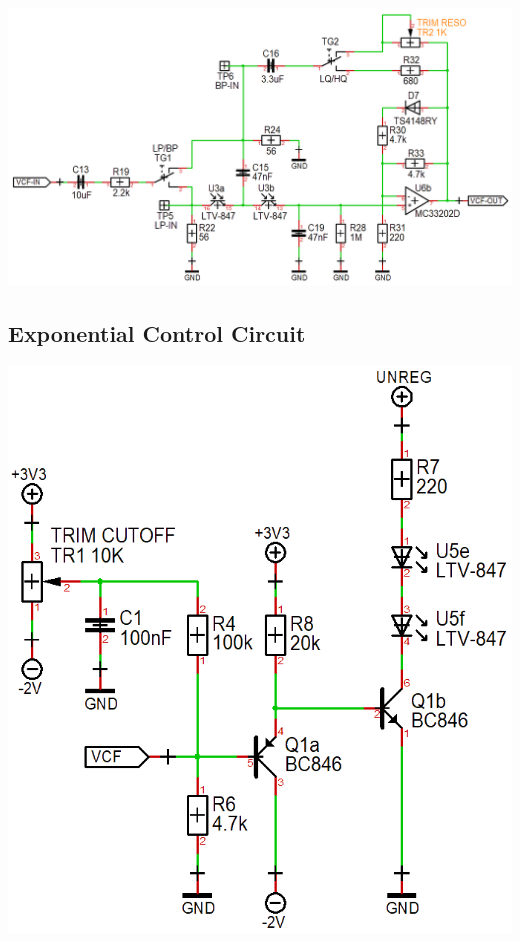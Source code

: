 \documentclass{scrartcl}
\begin{document}
\begin{center}
    \includegraphics[scale=0.39]{assets/schema-vcf.png}
\end{center}

\subsection{Exponential Control Circuit}

\begin{center}
    \includegraphics[scale=0.42]{assets/schema-expo.png}
\end{center}
\end{document}
